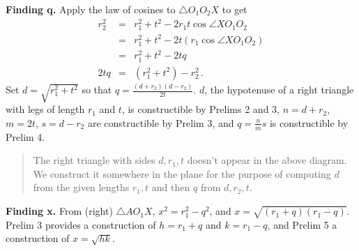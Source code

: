 \documentclass[11pt,a4paper]{article}
\newcommand*{\qed}{%
$\quad\quad$\raisebox{2pt}{\framebox[10pt]{\rule{0pt}{4pt}}}%
}
\begin{document}
\textbf{Finding q.} Apply the law of cosines to $\triangle O_1O_2X$ to get
\[
\renewcommand*{\arraystretch}{1.8}
\begin{array}{rcl}
r_2^2 &=& r_1^2 + t^2 - 2r_1t\cos\angle XO_1O_2\\
      &=& r_1^2 + t^2 - 2t(r_1\cos\angle XO_1O_2)\\
&=& r_1^2 + t^2 - 2tq\\
2tq &=& (r_1^2+t^2) - r_2^2\,.
\end{array}
\]
Set $d=\sqrt{r_1^2+t^2}$ so that $q=\frac{(d+r_2)(d-r_2)}{2t}$. $d$, the hypotenuse of a right triangle with legs of length $r_1$ and $t$, is constructible by Prelims 2 and 3, $n= d+ r_2$, $m= 2t$, $s =d -r_2$ are constructible by Prelim 3, and $q=\frac{n}{m}s$ is constructible by Prelim 4.
\begin{quote}
\vspace*{-8pt}
The right triangle with sides $d,r_1,t$ doesn't appear in the above diagram. We construct it somewhere in the plane for the purpose of computing $d$ from the given lengths $r_1,t$ and then $q$ from $d,r_2,t$. 
\vspace*{-8pt}
\end{quote}
\textbf{Finding x.} From (right) $\triangle AO_1X$, $x^2=r_1^2-q^2$, and $x=\sqrt{(r_1+q)(r_1-q)}$. Prelim 3 provides a construction of $h =r_1+ q$ and $k= r_1 - q$, and Prelim 5 a construction of $x= \sqrt{hk}$. \qed
\end{document}
